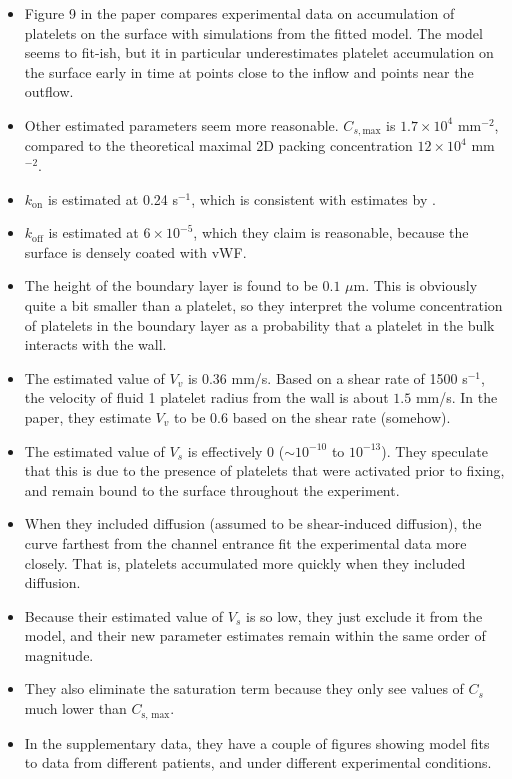 \documentclass[
10pt, %
letterpaper, %
twocolumn, %
landscape %
]{article}
\begin{document}
\begin{itemize}
\item Figure 9 in the paper compares experimental data on accumulation
  of platelets on the surface with simulations from the fitted
  model. The model seems to fit-ish, but it in particular
  underestimates platelet accumulation on the surface early in time at
  points close to the inflow and points near the outflow.
\item Other estimated parameters seem more
  reasonable. $C_{s,\text{max}}$ is $1.7 \times 10^4$ mm$^{-2}$,
  compared to the theoretical maximal 2D packing concentration $12
  \times 10^4$ mm$^{-2}$. 
\item $k_\text{on}$ is estimated at 0.24 s$^{-1}$, which is consistent
  with estimates by \cite{Fitzgibbon2014}.
\item $k_\text{off}$ is estimated at $6 \times 10^{-5}$, which they
  claim is reasonable, because the surface is densely coated with vWF.
\item The height of the boundary layer is found to be $0.1$
  $\mu$m. This is obviously quite a bit smaller than a platelet, so
  they interpret the volume concentration of platelets in the boundary
  layer as a probability that a platelet in the bulk interacts with
  the wall.
\item The estimated value of $V_v$ is 0.36 mm/s. Based on a shear rate
  of 1500 s$^{-1}$, the velocity of fluid 1 platelet radius from the
  wall is about $1.5$ mm/s. In the paper, they estimate $V_v$ to be
  0.6 based on the shear rate (somehow).
\item The estimated value of $V_s$ is effectively 0 ($\sim 10^{-10}$
  to $10^{-13}$). They speculate that this is due to the presence of
  platelets that were activated prior to fixing, and remain bound to
  the surface throughout the experiment.
\item When they included diffusion (assumed to be shear-induced
  diffusion), the curve farthest from the channel entrance fit the
  experimental data more closely. That is, platelets accumulated more
  quickly when they included diffusion.
\item Because their estimated value of $V_s$ is so low, they just
  exclude it from the model, and their new parameter estimates remain
  within the same order of magnitude.
\item They also eliminate the saturation term because they only see
  values of $C_s$ much lower than $C_\text{s, max}$.
\item In the supplementary data, they have a couple of figures showing
  model fits to data from different patients, and under different
  experimental conditions. 
\end{itemize}
\end{document}
